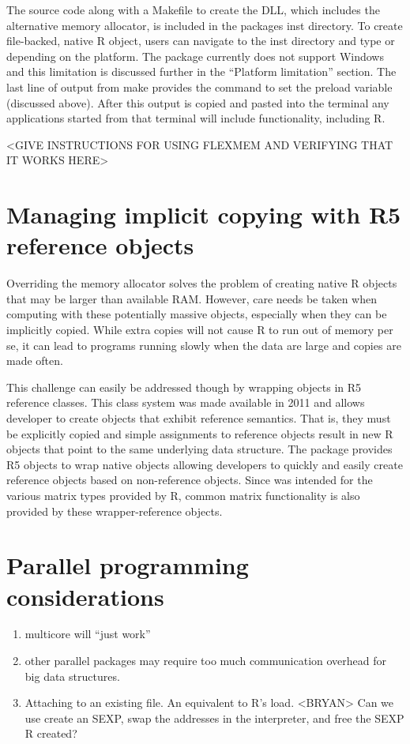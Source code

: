 The source code along with a Makefile to create the  DLL, which 
includes the alternative memory allocator, is included in the packages inst 
directory. To create file-backed, native R object, users can navigate to the
inst directory and type  or  depending on the
platform. The  package currently does not support Windows and
this limitation is discussed further in the ``Platform limitation'' section.
The last line of output from make provides the command to set the preload
variable (discussed above). After this output is copied and pasted into the
terminal any applications started from that terminal will include 
functionality, including R.

<GIVE INSTRUCTIONS FOR USING FLEXMEM AND VERIFYING THAT IT WORKS HERE>

\section{Managing implicit copying with R5 reference objects}

Overriding the memory allocator solves the problem of creating native
R objects that may be larger than available RAM. However, care needs
be taken when computing with these potentially massive objects, 
especially when they can be implicitly copied. While extra copies will
not cause R to run out of memory per se, it can lead to programs running
slowly when the data are large and copies are made often.

This challenge can easily be addressed though by wrapping objects in 
R5 reference classes. This class system was made available in 2011 and
allows developer to create objects that exhibit reference semantics.
That is, they must be explicitly copied and simple assignments to 
reference objects result in new R objects that point to the same 
underlying data structure. The  package provides R5 objects 
to wrap native objects allowing developers to quickly and easily create
reference objects based on non-reference objects. Since  
was intended for the various matrix types provided by R, common matrix
functionality is also provided by these wrapper-reference objects.

\section{Parallel programming considerations}

\begin{enumerate}
\item multicore will ``just work''
\item other parallel packages may require too much communication overhead
for big data structures.
\item Attaching to an existing file. An equivalent to R's load.
<BRYAN> Can we use create an SEXP, swap the addresses in the interpreter,
and free the SEXP R created?
\end{enumerate}

